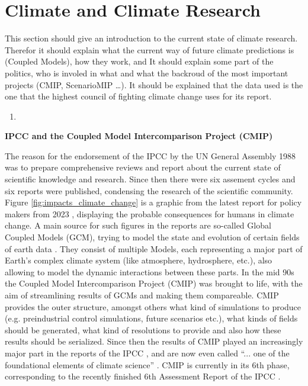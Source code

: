 \section{Climate and Climate Research}
\label{sec:climate}

This section should give an introduction to the current state of climate research. 
Therefor it should explain what the current way of future climate predictions is (Coupled Models), how they work, and 
It should explain some part of the politics, who is involed in what and what the backroud of the most important projects (CMIP, ScenarioMIP \dots). 
It should be explained that the data used is the one that the highest council of fighting climate change uses for its report. 

\begin{enumerate}
  \item
  
\end{enumerate}

\textbf{IPCC and the Coupled Model Intercomparison Project (CMIP)}


The reason for the endorsement of the IPCC by the UN General Assembly 1988 was to prepare comprehensive reviews and report about the current state of scientific knowledge and research. 
Since then there were six assement cycles and six reports were published, condensing the research of the scientific community. Figure \ref{fig:impacts_climate_change} is a graphic from the latest report for policy makers from 2023 \cite{lee2024climate}, displaying the probable consequences for humans in climate change.
A main source for such figures in the reports are so-called Global Coupled Models (GCM), trying to model the state and evolution of certain fields of earth data . 
They consist of multiple Models, each representing a major part of Earth's complex climate system (like atmosphere, hydrosphere, etc.), also allowing to model the dynamic interactions between these parts. 
In the mid 90s the Coupled Model Intercomparison Project (CMIP) was brought to life, with the aim of streamlining results of GCMs and making them compareable. 
CMIP provides the outer structure, amongst others what kind of simulations to produce (e.g. preindustrial control simulations, future scenarios etc.), what kinds of fields should be generated, what kind of resolutions to provide and also how these results should be serialized.
Since then the results of CMIP played an increasingly major part in the reports of the IPCC \cite{touzepeiffer_coupled_2020}, and are now even called \enquote{... one of the foundational elements of climate science} \cite{eyring_overview_2016}. 
CMIP is currently in its 6th phase, corresponding to the recently finished 6th Assessment Report of the IPCC \cite{lee2024climate}. 



